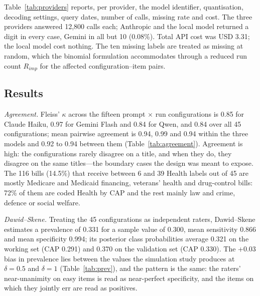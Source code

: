 Table~\ref{tab:providers} reports, per provider, the model identifier, quantisation, decoding
settings, query dates, number of calls, missing rate and cost. The three providers answered
12,800 calls each; Anthropic and the local model returned a digit in every case, Gemini in all but
10 (0.08\%). Total API cost was USD 3.31; the local model cost nothing. The ten missing labels are
treated as missing at random, which the binomial formulation accommodates through a reduced run
count $R_{imp}$ for the affected configuration--item pairs.


\subsection{Results}\label{sec:app_results}

\emph{Agreement.} Fleiss' $\kappa$ across the fifteen prompt $\times$ run configurations is 0.85
for Claude Haiku, 0.97 for Gemini Flash and 0.84 for Qwen, and 0.84 over all 45 configurations;
mean pairwise agreement is 0.94, 0.99 and 0.94 within the three models and 0.92 to 0.94 between
them (Table~\ref{tab:agreement}). Agreement is high: the configurations rarely disagree on a
title, and when they do, they disagree on the same titles---the boundary cases the design was
meant to expose. The 116 bills (14.5\%) that receive between 6 and 39 Health labels out of 45 are
mostly Medicare and Medicaid financing, veterans' health and drug-control bills: 72\% of them are
coded Health by CAP and the rest mainly law and crime, defence or social welfare.

\emph{Dawid--Skene.} Treating the 45 configurations as independent raters, Dawid--Skene
estimates a prevalence of 0.331 for a sample value of 0.300, mean sensitivity 0.866 and mean
specificity 0.994; its posterior class probabilities average 0.321 on the working set (CAP 0.291)
and 0.370 on the validation set (CAP 0.330). The +0.03 bias in prevalence lies between the values
the simulation study produces at $\delta = 0.5$ and $\delta = 1$ (Table~\ref{tab:prev}), and the
pattern is the same: the raters' near-unanimity on easy items is read as near-perfect
specificity, and the items on which they jointly err are read as positives.

